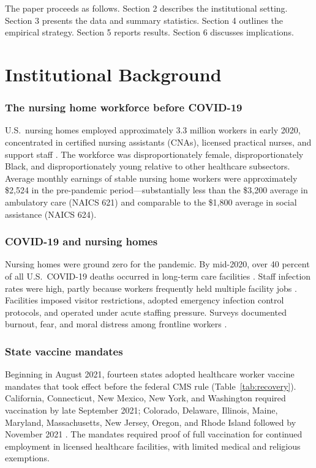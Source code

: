 \documentclass[12pt]{article}
\begin{document}
The paper proceeds as follows. Section 2 describes the institutional setting. Section 3 presents the data and summary statistics. Section 4 outlines the empirical strategy. Section 5 reports results. Section 6 discusses implications.

\section{Institutional Background}

\subsubsection*{The nursing home workforce before COVID-19} U.S.\ nursing homes employed approximately 3.3 million workers in early 2020, concentrated in certified nursing assistants (CNAs), licensed practical nurses, and support staff \citep{mcgarry2023shortages}. The workforce was disproportionately female, disproportionately Black, and disproportionately young relative to other healthcare subsectors. Average monthly earnings of stable nursing home workers were approximately \$2,524 in the pre-pandemic period---substantially less than the \$3,200 average in ambulatory care (NAICS 621) and comparable to the \$1,800 average in social assistance (NAICS 624).

\subsubsection*{COVID-19 and nursing homes} Nursing homes were ground zero for the pandemic. By mid-2020, over 40 percent of all U.S.\ COVID-19 deaths occurred in long-term care facilities \citep{barnett2020nursing}. Staff infection rates were high, partly because workers frequently held multiple facility jobs \citep{chen2021nursing}. Facilities imposed visitor restrictions, adopted emergency infection control protocols, and operated under acute staffing pressure. Surveys documented burnout, fear, and moral distress among frontline workers \citep{white2021front}.

\subsubsection*{State vaccine mandates} Beginning in August 2021, fourteen states adopted healthcare worker vaccine mandates that took effect before the federal CMS rule (Table~\ref{tab:recovery}). California, Connecticut, New Mexico, New York, and Washington required vaccination by late September 2021; Colorado, Delaware, Illinois, Maine, Maryland, Massachusetts, New Jersey, Oregon, and Rhode Island followed by November 2021 \citep{kff2022vaccine}. The mandates required proof of full vaccination for continued employment in licensed healthcare facilities, with limited medical and religious exemptions.
\end{document}
